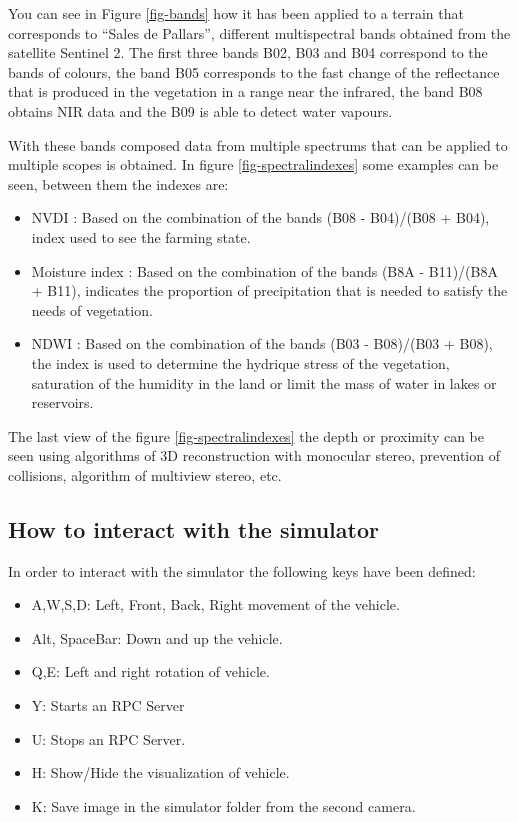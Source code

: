 \documentclass[10pt,a4paper,twocolumn,twoside]{article}
\begin{document}
You can see in Figure \ref{fig-bands} how it has been applied to a terrain that corresponds to ``Sales de Pallars'', different multispectral bands obtained from the satellite Sentinel 2. The first three bands B02, B03 and B04 correspond to the bands of colours, the band B05 corresponds to the fast change of the reflectance that is produced in the vegetation in a range near the infrared, the band B08 obtains NIR \cite{nir} data and the B09 is able to detect water vapours.

With these bands composed data from multiple spectrums that can be applied to multiple scopes is obtained. In figure \ref{fig-spectralindexes} some examples can be seen, between them the indexes are:

\begin{itemize}
\setlength\itemsep{0em}
\item 
{
	NVDI \cite{ndvi}: Based on the combination of the bands (B08 - B04)/(B08 + B04), index used to see the farming state.
}
\item
{
	Moisture index \cite{moisture}: Based on the combination of the bands (B8A - B11)/(B8A + B11), indicates the proportion of precipitation that is needed to satisfy the needs of vegetation.
}
\item
{
	NDWI \cite{ndwi}: Based on the combination of the bands (B03 - B08)/(B03 + B08), the index is used to determine the hydrique stress of the vegetation, saturation of the humidity in the land or limit the mass of water in lakes or reservoirs.
}
\end{itemize} 

The last view of the figure \ref{fig-spectralindexes} the depth or proximity can be seen using  algorithms of 3D reconstruction with monocular stereo, prevention of collisions, algorithm of multiview stereo, etc.

\subsection{How to interact with the simulator}
In order to interact with the simulator the following keys have been defined:

\begin{itemize}
\setlength\itemsep{0em}
\item A,W,S,D: Left, Front, Back, Right movement of the vehicle.
\item Alt, SpaceBar: Down and up the vehicle.
\item Q,E: Left and right rotation of vehicle.
\item Y: Starts an RPC Server
\item U: Stops an RPC Server.
\item H: Show/Hide the visualization of vehicle.
\item K: Save image in the simulator folder from the second camera.
\end{itemize}
\end{document}
